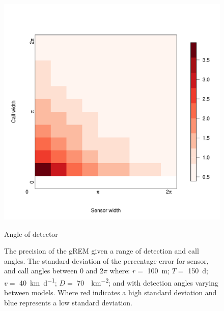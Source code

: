 \documentclass[a4paper,10pt,reqno,oneside]{amsart}
\begin{document}
\begin{figure}[t]
        \centering
		\includegraphics[width=1\textwidth]{imgs/ResultStandardDeviation.pdf}
		\caption{Angle of detector}
		\label{f:StandardDevaition}
        \caption{The precision of the gREM given a range of detection and call angles. The standard deviation of the percentage error for sensor, and call angles between 0 and $2\pi$ where: $r = $ \SI{100}{\meter}; $T = $ \SI{150}{\day}; $v = $ \SI{40}{\kilo\meter\per\day}; $D = $ \SI{70}{\animals\per\kilo\meter\squared}; and with detection angles varying between models. Where red indicates a high standard deviation and blue represents a low standard deviation.} 
\end{figure}
\end{document}
